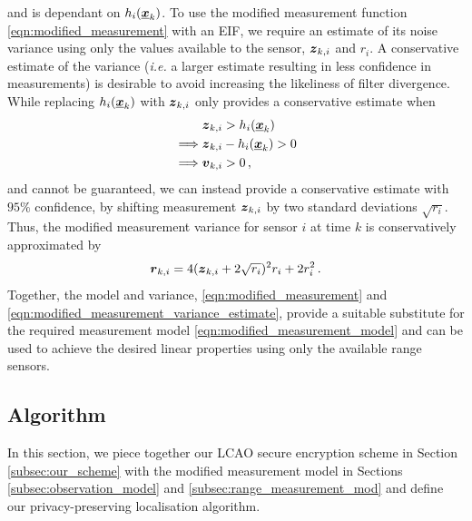 \documentclass[10pt,journal,compsoc]{IEEEtran}
\theoremstyle{definition}
\theoremstyle{definition}
\theoremstyle{remark}
\begin{document}
and is dependant on $h_i({\boldsymbol{\underline{x}}}_k)$. To use the modified measurement function \eqref{eqn:modified_measurement} with an EIF, we require an estimate of its noise variance using only the values available to the sensor, ${\boldsymbol{z}}_{k,i}$ and $r_i$. A conservative estimate of the variance (\textit{i.e.} a larger estimate resulting in less confidence in measurements) is desirable to avoid increasing the likeliness of filter divergence. While replacing $h_i({\boldsymbol{\underline{x}}}_k)$ with ${\boldsymbol{z}}_{k,i}$ only provides a conservative estimate when
\begin{equation}
    \begin{split}
        &{\boldsymbol{z}}_{k,i} > h_i({\boldsymbol{\underline{x}}}_k) \\
        \implies &{\boldsymbol{z}}_{k,i} - h_i({\boldsymbol{\underline{x}}}_k) > 0 \\
        \implies &{\boldsymbol{v}}_{k,i} > 0\,,
    \end{split}
\end{equation}
and cannot be guaranteed, we can instead provide a conservative estimate with $95\%$ confidence, by shifting measurement ${\boldsymbol{z}}_{k,i}$ by two standard deviations $\sqrt{r_i}$. Thus, the modified measurement variance for sensor $i$ at time $k$ is conservatively approximated by
\begin{equation}
    \rv{r}_{k, i} = 4(\rv{z}_{k,i} + 2\sqrt{r_i})^2r_i + 2r_i^2\,. \label{eqn:modified_measurement_variance_estimate}
\end{equation}
Together, the model and variance, \eqref{eqn:modified_measurement} and \eqref{eqn:modified_measurement_variance_estimate}, provide a suitable substitute for the required measurement model \eqref{eqn:modified_measurement_model} and can be used to achieve the desired linear properties using only the available range sensors.

% 
% 

\subsection{Algorithm} \label{subsec:algorithm}
In this section, we piece together our LCAO secure encryption scheme in Section \ref{subsec:our_scheme} with the modified measurement model in Sections \ref{subsec:observation_model} and \ref{subsec:range_measurement_mod} and define our privacy-preserving localisation algorithm.
\end{document}
